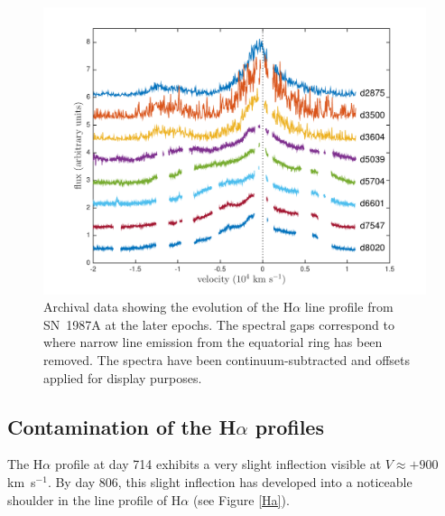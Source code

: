 \begin{figure}
\centering
\includegraphics[trim =45 10 45 15,clip=true,scale=0.8]{chapters/chapter5/images/Ha_evol_late_1col.pdf}
\caption{Archival data showing the evolution of the H$\alpha$
line profile from SN~1987A at the later epochs. The spectral gaps 
correspond to where narrow line emission from the equatorial ring has been 
removed. The spectra have been continuum-subtracted and offsets applied 
for display purposes.}
\label{Ha_evol_late}
\end{figure}


\subsection{Contamination of the H$\alpha$ profiles}

The H$\alpha$ profile at day 714 exhibits a very slight inflection visible 
at $V \approx +900$ km~s$^{-1}$.  By day 806, this slight inflection has 
developed into a noticeable shoulder in the line profile of H$\alpha$ (see 
Figure \ref{Ha}).

